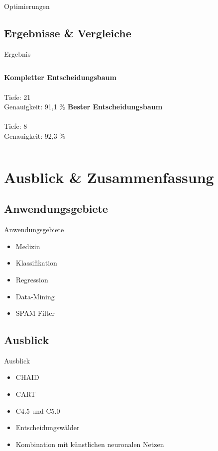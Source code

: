\begin{frame}{Optimierungen}
\end{frame}



\subsection{Ergebnisse \& Vergleiche}
\begin{frame}{Ergebnis}
\setlength{} 
\setlength{} 
\begin{columns}[b]
         \centering \textbf{Kompletter Entscheidungsbaum} \\[1em]  \\ Tiefe: 21 \\ Genauigkeit: 91{,}1 \% \pause
         \centering \textbf{Bester Entscheidungsbaum} \\[1em]  \\ Tiefe: 8 \\ Genauigkeit: 92{,}3 \% 
\end{columns}






\end{frame}


\section{Ausblick \& Zusammenfassung}

\subsection{Anwendungsgebiete}
\begin{frame}{Anwendungsgebiete}

\begin{itemize}[<+->]
    \item Medizin
    \item Klassifikation
    \item Regression
    \item Data-Mining
    \item SPAM-Filter
\end{itemize}


\end{frame}

\subsection{Ausblick}
\begin{frame}{Ausblick}
\begin{itemize}[<+->]
    \item CHAID %
    \item CART
    \item C4.5 und C5.0
    \item Entscheidungswälder
    \item Kombination mit künstlichen neuronalen Netzen
\end{itemize}

\end{frame}


